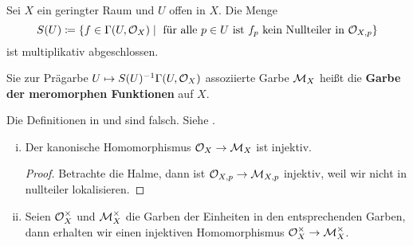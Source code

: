 \begin{bem}
\label{bem:14.5}
	Sei $X$ ein geringter Raum und $U$ offen in $X$. Die Menge
	\[
		S(U) \coloneqq \{ f \in \Gamma(U,\mathcal{O}_X)\mid \text{ für alle }p \in U\text{ ist }f_p \text{ kein Nullteiler in }\mathcal{O}_{X,p}\}
	\]
	ist multiplikativ abgeschlossen.
\end{bem}

\begin{defn}
\label{defn:14.6}
	Sie zur Prägarbe $U \mapsto S(U)^{-1}\Gamma(U,\mathcal{O}_X)$ assoziierte Garbe $\mathcal{M}_X$ heißt die \textbf{Garbe der meromorphen Funktionen} auf $X$.
\end{defn}

\begin{warn*}
	Die Definitionen in \cite[{}II.6]{hartshorne1977algebraic} und \cite[§21]{grothendieck1967elements} sind falsch. Siehe \cite{kleiman1979misconceptions}.
\end{warn*}

\begin{bem}
\label{bem:14.7}
	\begin{enumerate}[i)]
		\item Der kanonische Homomorphismus $\mathcal{O}_X \to \mathcal{M}_X$ ist injektiv.
		\begin{proof}
			Betrachte die Halme, dann ist $\mathcal{O}_{X,p}\to \mathcal{M}_{X,p}$ injektiv, weil wir nicht in nullteiler lokalisieren.
		\end{proof}
		\item Seien $\mathcal{O}_X^\times$ und $\mathcal{M}_X^\times$ die Garben der Einheiten in den entsprechenden Garben, dann erhalten wir einen injektiven Homomorphismus $\mathcal{O}_X^\times \to \mathcal{M}_X^\times$.
	\end{enumerate}
\end{bem}

